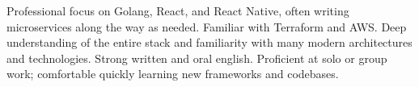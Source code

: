 

\begin{cvparagraph}

Professional focus on Golang, React, and React Native, often writing microservices along the way as needed. Familiar with Terraform and AWS\@. Deep understanding of the entire stack and familiarity with many modern architectures and technologies. Strong written and oral english. Proficient at solo or group work; comfortable quickly learning new frameworks and codebases.
\end{cvparagraph}
